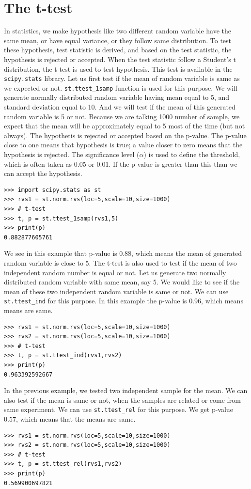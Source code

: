 \documentclass[10pt]{book}
\begin{document}
{\section{The t-test}
In statistics, we make hypothesis like two different random variable have the same mean, or have equal variance, or they follow same distribution. To test these hypothesis, test statistic is derived, and based on the test statistic, the hypothesis is rejected or accepted. When the test statistic follow a Student's t distribution, the t-test is used to test hypothesis. This test is available in the \verb"scipy.stats" library. Let us first test if the mean of random variable is same as we expected or not. \verb"st.ttest_1samp" function is used for this purpose. We will generate normally distributed random variable having mean equal to 5, and standard deviation equal to 10. And we will test if the mean of this generated random variable is 5 or not. Because we are talking 1000 number of sample, we expect that the mean will be approximately equal to 5 most of the time (but not always). The hypothetis is rejected or accepted based on the p-value. The p-value close to one means that hypothesis is true; a value 
closer to zero means that the hypothesis is rejected. The significance level ($\alpha$) is used to define the threshold, which is often taken as 0.05 or 0.01. If the p-value is greater than this than we can accept the hypothesis. 
\beforeverb \begin{verbatim}
>>> import scipy.stats as st
>>> rvs1 = st.norm.rvs(loc=5,scale=10,size=1000)
>>> # t-test
>>> t, p = st.ttest_1samp(rvs1,5)
>>> print(p)
0.882877605761
\end{verbatim} \afterverb
We see in this example that p-value is 0.88, which means the mean of generated random variable is close to 5. The t-test is also used to test if the mean of two independent random number is equal or not. Let us generate two normally distributed random variable with same mean, say 5. We would like to see if the mean of these two independent random variable is same or not. We can use \verb"st.ttest_ind" for this purpose. In this example the p-value is 0.96, which means means are same.
\beforeverb \begin{verbatim}
>>> rvs1 = st.norm.rvs(loc=5,scale=10,size=1000)
>>> rvs2 = st.norm.rvs(loc=5,scale=10,size=1000)
>>> # t-test
>>> t, p = st.ttest_ind(rvs1,rvs2)
>>> print(p)
0.963392592667
\end{verbatim} \afterverb

In the previous example, we tested two independent sample for the mean. We can also test if the mean is same or not, when the samples are related or come from same experiment. We can use \verb"st.ttest_rel" for this purpose. We get p-value 0.57, which means that the means are same.
\beforeverb \begin{verbatim}
>>> rvs1 = st.norm.rvs(loc=5,scale=10,size=1000)
>>> rvs2 = st.norm.rvs(loc=5,scale=10,size=1000)
>>> # t-test
>>> t, p = st.ttest_rel(rvs1,rvs2)
>>> print(p)
0.569900697821
\end{verbatim} \afterverb

}
\end{document}
